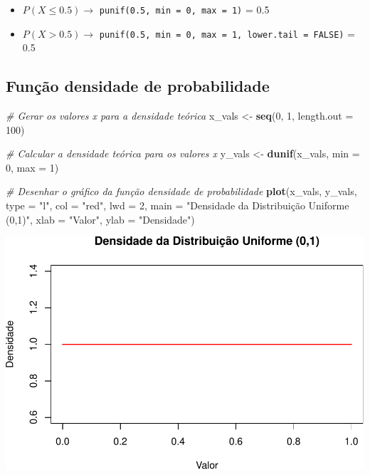 \documentclass[
]{book}
\newenvironment{Shaded}{\begin{snugshade}}{\end{snugshade}}
\newcommand{\AttributeTok}[1]{\textcolor[rgb]{0.13,0.29,0.53}{#1}}
\newcommand{\CommentTok}[1]{\textcolor[rgb]{0.56,0.35,0.01}{\textit{#1}}}
\newcommand{\DecValTok}[1]{\textcolor[rgb]{0.00,0.00,0.81}{#1}}
\newcommand{\FunctionTok}[1]{\textcolor[rgb]{0.13,0.29,0.53}{\textbf{#1}}}
\newcommand{\NormalTok}[1]{#1}
\newcommand{\OtherTok}[1]{\textcolor[rgb]{0.56,0.35,0.01}{#1}}
\newcommand{\StringTok}[1]{\textcolor[rgb]{0.31,0.60,0.02}{#1}}
\begin{document}
\begin{itemize}
\item
  \(P(X\leq 0.5) \to\) \texttt{punif(0.5,\ min\ =\ 0,\ max\ =\ 1)} = 0.5
\item
  \(P(X > 0.5) \to\) \texttt{punif(0.5,\ min\ =\ 0,\ max\ =\ 1,\ lower.tail\ =\ FALSE)} = 0.5
\end{itemize}

\subsection{Função densidade de probabilidade}\label{funuxe7uxe3o-densidade-de-probabilidade}

\begin{Shaded}
\begin{Highlighting}[]
\CommentTok{\# Gerar os valores x para a densidade teórica}
\NormalTok{x\_vals }\OtherTok{\textless{}{-}} \FunctionTok{seq}\NormalTok{(}\DecValTok{0}\NormalTok{, }\DecValTok{1}\NormalTok{, }\AttributeTok{length.out =} \DecValTok{100}\NormalTok{)}

\CommentTok{\# Calcular a densidade teórica para os valores x}
\NormalTok{y\_vals }\OtherTok{\textless{}{-}} \FunctionTok{dunif}\NormalTok{(x\_vals, }\AttributeTok{min =} \DecValTok{0}\NormalTok{, }\AttributeTok{max =} \DecValTok{1}\NormalTok{)}

\CommentTok{\# Desenhar o gráfico da função densidade de probabilidade}
\FunctionTok{plot}\NormalTok{(x\_vals, y\_vals, }\AttributeTok{type =} \StringTok{"l"}\NormalTok{, }
     \AttributeTok{col =} \StringTok{"red"}\NormalTok{, }\AttributeTok{lwd =} \DecValTok{2}\NormalTok{, }
     \AttributeTok{main =} \StringTok{"Densidade da Distribuição Uniforme (0,1)"}\NormalTok{,}
     \AttributeTok{xlab =} \StringTok{"Valor"}\NormalTok{, }\AttributeTok{ylab =} \StringTok{"Densidade"}\NormalTok{)}
\end{Highlighting}
\end{Shaded}

\includegraphics{meuLivro2_files/figure-latex/unnamed-chunk-123-1.pdf}
\end{document}
